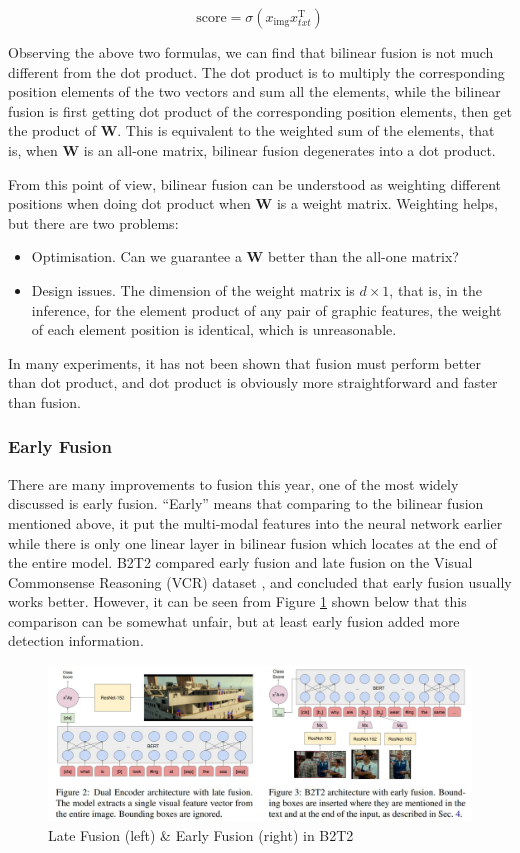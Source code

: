 $$
\text {score}=\sigma\left(x_{\text {img}} x_{t x t}^{\mathrm{T}}\right)
$$

Observing the above two formulas, we can find that bilinear fusion is not much different from the dot product. The dot product is to multiply the corresponding position elements of the two vectors and sum all the elements, while the bilinear fusion is first getting dot product of the corresponding position elements, then get the product of $\mathbf{W}$. This is equivalent to the weighted sum of the elements, that is, when $\mathbf{W}$ is an all-one matrix, bilinear fusion degenerates into a dot product.

From this point of view, bilinear fusion can be understood as weighting different positions when doing dot product when $\mathbf{W}$ is a weight matrix. Weighting helps, but there are two problems:

\begin{itemize}
    \item Optimisation. Can we guarantee a $\mathbf{W}$ better than the all-one matrix?
    \item Design issues. The dimension of the weight matrix is $d\times1$, that is, in the inference, for the element product of any pair of graphic features, the weight of each element position is identical, which is unreasonable.
\end{itemize}

In many experiments, it has not been shown that fusion must perform better than dot product, and dot product is obviously more straightforward and faster than fusion.

\subsubsection{Early Fusion}
There are many improvements to fusion this year, one of the most widely discussed is early fusion. ``Early'' means that comparing to the bilinear fusion mentioned above, it put the multi-modal features into the neural network earlier while there is only one linear layer in bilinear fusion which locates at the end of the entire model. B2T2 \cite{B2T2} compared early fusion and late fusion on the Visual Commonsense Reasoning (VCR) dataset \cite{zellers2019vcr}, and concluded that early fusion usually works better. However, it can be seen from Figure \ref{fig:fusionb2t2} shown below that this comparison can be somewhat unfair, but at least early fusion added more detection information.

\begin{figure}[h!]
\centering
\includegraphics[width=\textwidth]{fusion.pdf}
\caption{Late Fusion (left) \& Early Fusion (right) in B2T2 \cite{B2T2}}
\label{fig:fusionb2t2}
\end{figure}

